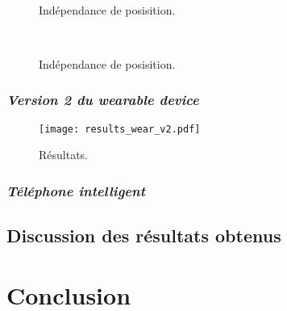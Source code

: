 \begin{figure}[H]
    \centering
    \\[20pt]
    \caption{Indépendance de posisition.}
    \label{fig:pos_ind_wear_v1}
\end{figure}

\begin{figure}[H]
    \centering
    \\[20pt]
    \caption{Indépendance de posisition.}
    \label{fig:user_ind_wear_v1}
\end{figure}

\subsubsection{\textit{Version 2 du wearable device}}

\begin{figure}[H]
	\centering
	\texttt{[image: results\_wear\_v2.pdf]}
        \caption{Résultats.}
	\label{fig:results_wear_v2}
\end{figure}

\subsubsection{\textit{Téléphone intelligent}}

\subsection{Discussion des résultats obtenus}

\section{Conclusion}